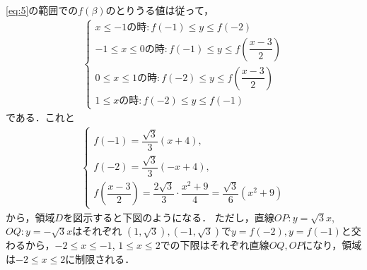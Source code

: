 \documentclass[../../main.tex]{subfiles}
\begin{document}
\cref{eq:5}の範囲での$f(\beta)$のとりうる値は従って，
\begin{align}
  \begin{cases}
    x \le -1 \text{の時}: f(-1) \le y \le f(-2) \\
    -1 \le x \le 0 \text{の時}: f(-1) \le y \le f\left(\dfrac{x-3}{2}\right) \\
    0 \le x \le 1  \text{の時}: f(-2) \le y \le f\left(\dfrac{x-3}{2}\right) \\
    1 \le x \text{の時}: f(-2) \le y \le f(-1)
  \end{cases} \label{eq:7}
\end{align}
である．これと
\begin{align}
  \begin{cases}
    f(-1)=\dfrac{\sqrt{3}}{3}(x+4), \\
    f(-2)=\dfrac{\sqrt{3}}{3}(-x+4), \\
    f\left(\dfrac{x-3}{2}\right)=\dfrac{2\sqrt{3}}{3}\cdot\dfrac{x^2+9}{4} = \dfrac{\sqrt{3}}{6}(x^2+9)
  \end{cases}
\end{align}
から，領域$D$を図示すると下図のようになる．
ただし，直線$OP: y = \sqrt{3}x$, $OQ: y = -\sqrt{3}x$はそれぞれ
$(1,\sqrt{3}), (-1,\sqrt{3})$で$y=f(-2), y=f(-1)$と交わるから，$-2 \le x \le -1$, $1 \le x \le 2$での下限はそれぞれ直線$OQ, OP$になり，領域は$-2 \le x \le 2$に制限される．
\end{document}
